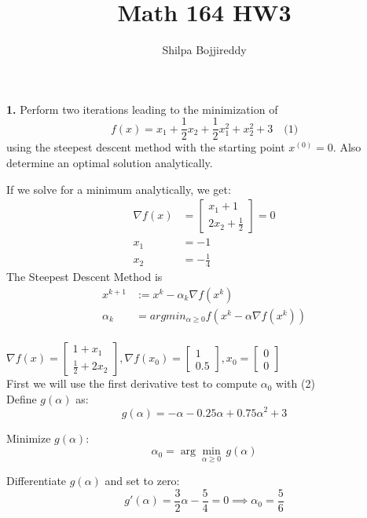 \documentclass[12pt]{article}
\begin{document}
\title{Math 164 HW3}
\author{Shilpa Bojjireddy}
\maketitle

\begin{mybluebox}
  \textbf{1.} Perform two iterations leading to the minimization of
\[
f(x) = x_1 + \frac{1}{2} x_2 + \frac{1}{2} x_1^2 + x_2^2 + 3 \quad \text{(1)}
\]
using the steepest descent method with the starting point $x^{(0)} = 0$. Also determine an optimal solution analytically.
\end{mybluebox}
If we solve for a minimum analytically, we get:
\begin{align*}
\nabla f(x) &= \begin{bmatrix}
  x_1 + 1 \\
  2x_2 + \frac{1}{2}
\end{bmatrix} = 0\\
x_1 &= -1 \\
x_2 &= -\frac{1}{4} 
\end{align*}
The Steepest Descent Method is 
\begin{align}
  x^{k+1} &:= x^k - \alpha_k \nabla f(x^k) \\
  \alpha_k &= argmin_{\alpha \geq 0} f(x^k - \alpha \nabla f(x^k))
\end{align}
\\ $\nabla f(x) = \begin{bmatrix}
  1 + x_1 \\
  \frac{1}{2} + 2x_2 
\end{bmatrix}, \nabla f(x_0) = \begin{bmatrix}
  1 \\ 0.5
\end{bmatrix}, x_0 = \begin{bmatrix}
  0 \\ 0
\end{bmatrix}$ \\

First we will use the first derivative test to compute $\alpha_{0}$ with (2)
\\Define \( g(\alpha) \) as:
\[
g(\alpha) = -\alpha - 0.25\alpha + 0.75\alpha^2 + 3
\]

Minimize \( g(\alpha) \):
\[
\alpha_0 = \arg \min_{\alpha \geq 0} \, g(\alpha)
\]

Differentiate \( g(\alpha) \) and set to zero:
\[
g'(\alpha) = \frac{3}{2}\alpha - \frac{5}{4} = 0 \implies \alpha_0 = \frac{5}{6}
\]
\end{document}
